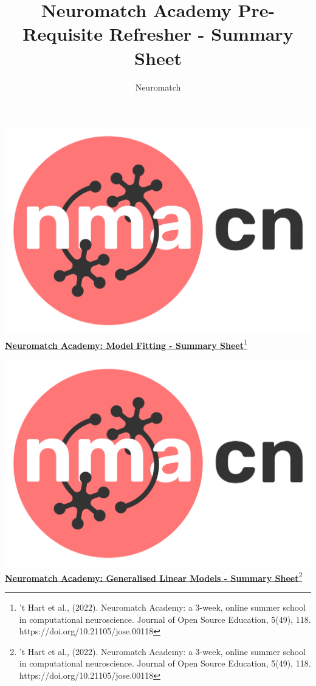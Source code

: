 \documentclass[10pt,a4paper]{article}
\title{Neuromatch Academy Pre-Requisite Refresher - Summary Sheet}
\author{Neuromatch}
\begin{document}
\includegraphics[scale=0.03]{Figures/NMACN.png}\href{https://compneuro.neuromatch.io/tutorials/intro.html}{\textbf{\Huge{Neuromatch Academy: Model Fitting - Summary Sheet}}\footnote{’t Hart et al., (2022). Neuromatch Academy: a 3-week, online summer school in computational neuroscience. Journal of Open Source Education, 5(49), 118. https://doi.org/10.21105/jose.00118}}
\small
\begin{multicols}{3}
\let\clearpage\relax

\end{multicols}
\newpage
\includegraphics[scale=0.03]{Figures/NMACN.png}\href{https://compneuro.neuromatch.io/tutorials/intro.html}{\textbf{\Huge{Neuromatch Academy: Generalised Linear Models - Summary Sheet}}\footnote{’t Hart et al., (2022). Neuromatch Academy: a 3-week, online summer school in computational neuroscience. Journal of Open Source Education, 5(49), 118. https://doi.org/10.21105/jose.00118}}
\end{document}
